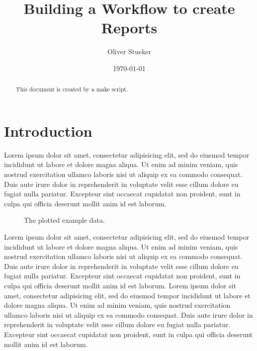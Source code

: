 \documentclass[10pt,letterpaper]{article}
\begin{document}
\title{Building a Workflow to create Reports}
\author{Oliver Stueker}
\date{\today}
\maketitle

\begin{abstract}
This document is created by a make script.
\end{abstract}

\section{Introduction}

Lorem ipsum dolor sit amet, consectetur adipisicing elit, sed do eiusmod
tempor incididunt ut labore et dolore magna aliqua. Ut enim ad minim veniam,
quis nostrud exercitation ullamco laboris nisi ut aliquip ex ea commodo
consequat. Duis aute irure dolor in reprehenderit in voluptate velit esse
cillum dolore eu fugiat nulla pariatur. Excepteur sint occaecat cupidatat non
proident, sunt in culpa qui officia deserunt mollit anim id est laborum. 

\begin{figure}[!ht]
 \centering
 
 \caption{The plotted example data.}
\end{figure}

Lorem ipsum dolor sit amet, consectetur adipisicing elit, sed do eiusmod
tempor incididunt ut labore et dolore magna aliqua. Ut enim ad minim veniam,
quis nostrud exercitation ullamco laboris nisi ut aliquip ex ea commodo
consequat. Duis aute irure dolor in reprehenderit in voluptate velit esse
cillum dolore eu fugiat nulla pariatur. Excepteur sint occaecat cupidatat non
proident, sunt in culpa qui officia deserunt mollit anim id est laborum. 
Lorem ipsum dolor sit amet, consectetur adipisicing elit, sed do eiusmod
tempor incididunt ut labore et dolore magna aliqua. Ut enim ad minim veniam,
quis nostrud exercitation ullamco laboris nisi ut aliquip ex ea commodo
consequat. Duis aute irure dolor in reprehenderit in voluptate velit esse
cillum dolore eu fugiat nulla pariatur. Excepteur sint occaecat cupidatat non
proident, sunt in culpa qui officia deserunt mollit anim id est laborum.
\end{document}
